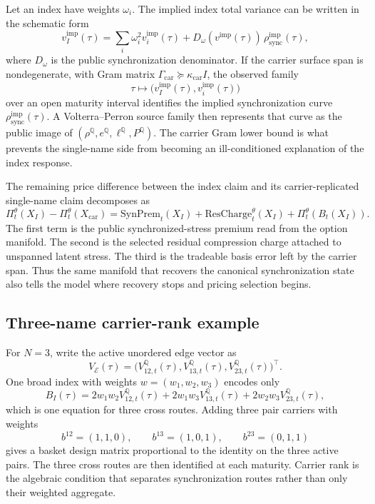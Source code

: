 \documentclass[11pt,a4paper]{amsart}
\theoremstyle{plain}
\theoremstyle{definition}
\theoremstyle{remark}
\newcommand{\QQ}{\mathbb{Q}}
\newcommand{\cE}{\mathcal{E}}
\begin{document}
Let an index have weights \(\omega_i\).  The implied index total variance can be written in the
schematic form
\[
        v_I^{\mathrm{imp}}(\tau)
        =
        \sum_i \omega_i^2 v_i^{\mathrm{imp}}(\tau)
        +
        D_\omega(v^{\mathrm{imp}}(\tau))\,
        \rho_{\mathrm{sync}}^{\mathrm{imp}}(\tau),
\]
where \(D_\omega\) is the public synchronization denominator.  If the carrier surface span is
nondegenerate, with Gram matrix \(\Gamma_{\mathrm{car}}\succeq\kappa_{\mathrm{car}}I\), the
observed family
\[
        \tau\mapsto
        \bigl(v_I^{\mathrm{imp}}(\tau),v_i^{\mathrm{imp}}(\tau)\bigr)
\]
over an open maturity interval identifies the implied synchronization curve
\(\rho_{\mathrm{sync}}^{\mathrm{imp}}(\tau)\).  A Volterra--Perron source family then represents
that curve as the public image of \((\rho^\QQ,e^\QQ,\ell^\QQ,P^\QQ)\).  The carrier Gram lower
bound is what prevents the single-name side from becoming an ill-conditioned explanation of the
index response.

The remaining price difference between the index claim and its carrier-replicated single-name
claim decomposes as
\[
        \Pi_t^\theta(X_I)-\Pi_t^\theta(X_{\mathrm{car}})
        =
        \mathrm{SynPrem}_t(X_I)
        +
        \mathrm{ResCharge}_t^\theta(X_I)
        +
        \Pi_t^\theta(B_t(X_I)).
\]
The first term is the public synchronized-stress premium read from the option manifold.  The
second is the selected residual compression charge attached to unspanned latent stress.  The
third is the tradeable basis error left by the carrier span.  Thus the same manifold that
recovers the canonical synchronization state also tells the model where recovery stops and
pricing selection begins.

\subsection{Three-name carrier-rank example}

For \(N=3\), write the active unordered edge vector as
\[
        V_{\cE}(\tau)
        =
        \bigl(V_{12,t}^\QQ(\tau),V_{13,t}^\QQ(\tau),V_{23,t}^\QQ(\tau)\bigr)^\top .
\]
One broad index with weights \(w=(w_1,w_2,w_3)\) encodes only
\[
        B_I(\tau)
        =
        2w_1w_2V_{12,t}^\QQ(\tau)
        +2w_1w_3V_{13,t}^\QQ(\tau)
        +2w_2w_3V_{23,t}^\QQ(\tau),
\]
which is one equation for three cross routes.  Adding three pair carriers with weights
\[
        b^{12}=(1,1,0),\qquad
        b^{13}=(1,0,1),\qquad
        b^{23}=(0,1,1)
\]
gives a basket design matrix proportional to the identity on the three active pairs.  The three
cross routes are then identified at each maturity.  Carrier rank is the algebraic condition that
separates synchronization routes rather than only their weighted aggregate.
\end{document}
